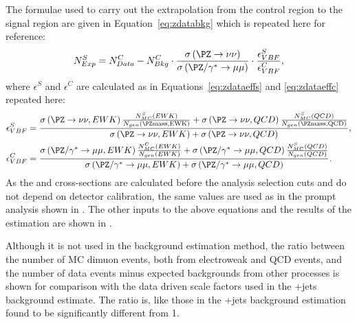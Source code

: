 The formulae used to carry out the extrapolation from the control region to the signal region are given in Equation~\ref{eq:zdatabkg} which is repeated here for reference:
\begin{equation}
  \label{eq:zdatabkgrep}
  N^{S}_{Exp}=N^{C}_{Data}-N^{C}_{Bkg}\cdot\frac{\sigma\left(\PZ\rightarrow\nu\nu\right)}{\sigma\left(\PZ/\gamma^{*}\rightarrow\mu\mu\right)}\cdot\frac{\epsilon^{S}_{VBF}}{\epsilon^{C}_{VBF}},
\end{equation}
where $\epsilon^{S}$ and $\epsilon^{C}$ are calculated as in Equations~\ref{eq:zdataeffs} and \ref{eq:zdataeffc} repeated here:
\begin{align}
  \label{eq:zdataeffsrep}
  \epsilon^{S}_{VBF}&=\frac{ \sigma\left(\PZ\rightarrow\nu\nu,EWK\right) \frac{N^{S}_{MC}\left(EWK\right)} {N_{gen}\left(\PZ \rm{mass},EWK\right)} + \sigma\left(\PZ\rightarrow\nu\nu,QCD\right) \frac{N^{S}_{MC}\left(QCD\right)} {N_{gen}\left(\PZ \rm{mass},QCD\right)} } {\sigma\left(\PZ\rightarrow\nu\nu,EWK\right) + \sigma\left(\PZ\rightarrow\nu\nu,QCD\right)},\\
  \label{eq:zdataeffcrep}
  \epsilon^{C}_{VBF}&=\frac{  \sigma\left(\PZ/\gamma^{*}\rightarrow\mu\mu,EWK\right) \frac{N^{C}_{MC}\left(EWK\right)} {N_{gen}\left(EWK\right)} + \sigma\left(\PZ/\gamma^{*}\rightarrow\mu\mu,QCD\right) \frac{N^{S}_{MC}\left(QCD\right)} {N_{gen}\left(QCD\right)}  }{\sigma\left(\PZ/\gamma^{*}\rightarrow\mu\mu,EWK\right)+\sigma\left(\PZ/\gamma^{*}\rightarrow\mu\mu,QCD\right)}.
\end{align}
As the \Zmumu and \Znunu cross-sections are calculated before the analysis selection cuts and do not depend on detector calibration, the same values are used as in the prompt analysis shown in . The other inputs to the above equations and the results of the estimation are shown in .

Although it is not used in the \Znunu background estimation method, the ratio between the number of \ac{MC} dimuon events, both from electroweak and \ac{QCD} events, and the number of data events minus expected backgrounds from other processes is shown for comparison with the data driven scale factors used in the \PW+jets background estimate. The ratio is, like those in the \PW+jets background estimation found to be significantly different from 1. 

